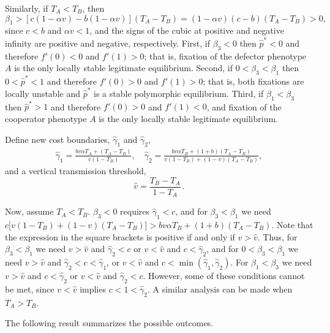 \documentclass[12pt]{extarticle}
\begin{document}
{Similarly, if $T_A<T_B$, then
\begin{equation} \label{eq:beta1_rev}
   \beta_1 > [c(1-\alpha v) - b(1-\alpha v)] (T_A-T_B) 
   = (1-\alpha v)(c-b)(T_A-T_B) > 0,
 \end{equation}
since $c<b$ and $\alpha v < 1$, and the signs of the cubic at positive and negative infinity are positive and negative, respectively. 
First, if $\beta_3<0$ then $\hat{p}^*<0$ and therefore $f'(0)<0$ and $f'(1)>0$; that is, fixation of the defector phenotype $A$ is the only locally stable legitimate equilibrium.
Second, if $0<\beta_3<\beta_1$ then $0<\hat{p}^*<1$ and therefore $f'(0)>0$ and $f'(1)>0$; that is, both fixations are locally unstable and $\hat{p}^*$ is a stable polymorphic equilibrium.
Third, if $\beta_1<\beta_3$ then $\hat{p}^*>1$ and therefore $f'(0)>0$ and $f'(1)<0$, and fixation of the cooperator phenotype $A$ is the only locally stable legitimate equilibrium.

Define new cost boundaries, $\hat\gamma_1$ and $\hat\gamma_2$,
\begin{equation} \label{eq:cost_boundaries_v}
\begin{aligned}
\hat\gamma_1 = \frac{b v \alpha T_A + (T_A - T_B)}{v(1-T_B)}, \quad
\hat\gamma_2 = \frac{b v \alpha T_B + (1+b) (T_A - T_B)}{v(1-T_B) + (1-v)(T_A-T_B)},
\end{aligned}
\end{equation}
and  a vertical transmission threshold,
\begin{equation} \label{eq:v_threshold}
\hat v = \frac{T_B - T_A}{1-T_A} \,.
\end{equation}

Now, assume $T_A<T_B$.
$\beta_3<0$ requires $\hat\gamma_1<c$,
and for $\beta_3<\beta_1$ we need $c\big[v(1-T_B) + (1-v)(T_A-T_B)\big] > bv\alpha T_B + (1+b)(T_A-T_B)$.
Note that the expression in the square brackets is positive if and only if $v > \hat v$.
Thus, for $\beta_3<\beta_1$ we need $v > \hat v$ and $\hat\gamma_2 < c$ or $v < \hat v$ and $c < \hat\gamma_2$,
and for $0<\beta_3<\beta_1$ we need $v > \hat v$ and $\hat\gamma_2 < c < \hat\gamma_1$, or $v < \hat v$ and $c < \min(\hat\gamma_1, \hat\gamma_2)$. For $\beta_1<\beta_3$ we need $v > \hat v$ and $c<\hat\gamma_2$ or $v < \hat v$ and $\hat\gamma_2<c$.
However, some of these conditions cannot be met, since $v < \hat v$ implies $c<1<\hat\gamma_2$.
A similar analysis can be made when $T_A>T_B$.

The following result summarizes the possible outcomes.
\\

}
\end{document}
